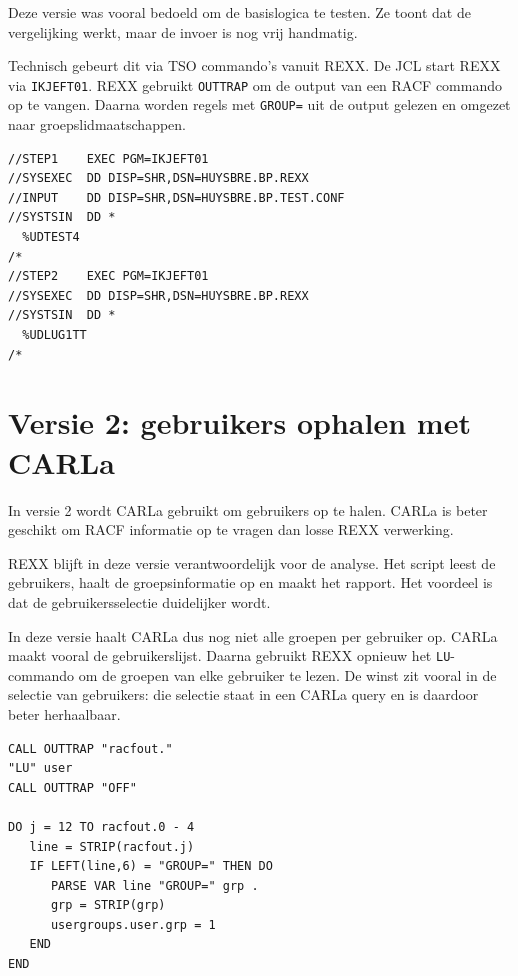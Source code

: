 Deze versie was vooral bedoeld om de basislogica te testen. Ze toont dat de vergelijking werkt, maar de invoer is nog vrij handmatig.

Technisch gebeurt dit via TSO commando's vanuit REXX. De JCL start REXX via \texttt{IKJEFT01}. REXX gebruikt \texttt{OUTTRAP} om de output van een RACF commando op te vangen. Daarna worden regels met \texttt{GROUP=} uit de output gelezen en omgezet naar groepslidmaatschappen.

\begin{listing}[htbp]
\begin{verbatim}
//STEP1    EXEC PGM=IKJEFT01
//SYSEXEC  DD DISP=SHR,DSN=HUYSBRE.BP.REXX
//INPUT    DD DISP=SHR,DSN=HUYSBRE.BP.TEST.CONF
//SYSTSIN  DD *
  %UDTEST4
/*
//STEP2    EXEC PGM=IKJEFT01
//SYSEXEC  DD DISP=SHR,DSN=HUYSBRE.BP.REXX
//SYSTSIN  DD *
  %UDLUG1TT
/*
\end{verbatim}
\caption[Versie 1: JCL start twee REXX scripts]{Fragment uit versie 1: de JCL start twee REXX scripts na elkaar. Bron: eigen PoC-scriptbestand \texttt{VERSIE\_1.txt}.}
\label{lst:v1-jcl}
\end{listing}

\section{Versie 2: gebruikers ophalen met CARLa}

In versie 2 wordt CARLa gebruikt om gebruikers op te halen. CARLa is beter geschikt om RACF informatie op te vragen dan losse REXX verwerking.

REXX blijft in deze versie verantwoordelijk voor de analyse. Het script leest de gebruikers, haalt de groepsinformatie op en maakt het rapport. Het voordeel is dat de gebruikersselectie duidelijker wordt.

In deze versie haalt CARLa dus nog niet alle groepen per gebruiker op. CARLa maakt vooral de gebruikerslijst. Daarna gebruikt REXX opnieuw het \texttt{LU}-commando om de groepen van elke gebruiker te lezen. De winst zit vooral in de selectie van gebruikers: die selectie staat in een CARLa query en is daardoor beter herhaalbaar.

\begin{listing}[htbp]
\begin{verbatim}
CALL OUTTRAP "racfout."
"LU" user
CALL OUTTRAP "OFF"

DO j = 12 TO racfout.0 - 4
   line = STRIP(racfout.j)
   IF LEFT(line,6) = "GROUP=" THEN DO
      PARSE VAR line "GROUP=" grp .
      grp = STRIP(grp)
      usergroups.user.grp = 1
   END
END
\end{verbatim}
\caption[REXX leest groepen uit LU-output]{Fragment uit de REXX verwerking: de output van \texttt{LU} wordt opgevangen en regels met \texttt{GROUP=} worden verwerkt. Bron: eigen PoC-scriptbestanden \texttt{VERSIE\_1.txt} en \texttt{VERSIE\_2.txt}.}
\label{lst:rexx-lu-groups}
\end{listing}

